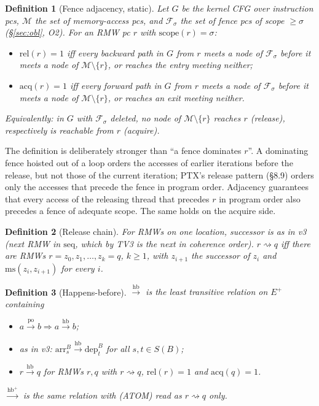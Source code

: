 \documentclass[11pt]{article}
\newtheorem{definition}{Definition}
\theoremstyle{remark}
\newcommand{\Eplus}{E^{+}}
\newcommand{\PO}{\xrightarrow{\mathrm{po}}}
\newcommand{\HB}{\xrightarrow{\mathrm{hb}}}
\newcommand{\HBu}{\xrightarrow{\mathrm{hb}^{+}}}
\newcommand{\scope}{\mathrm{scope}}
\newcommand{\rel}{\mathrm{rel}}
\newcommand{\acq}{\mathrm{acq}}
\newcommand{\ms}{\mathrm{ms}}
\newcommand{\seq}{\mathrm{seq}}
\newcommand{\chain}{\rightsquigarrow}
\newcommand{\Fences}{\mathcal{F}}
\newcommand{\Mem}{\mathcal{M}}
\begin{document}
\begin{definition}[Fence adjacency, static]\label{def:gate}
Let $G$ be the kernel CFG over instruction pcs, $\Mem$ the set of memory-access
pcs, and $\Fences_\sigma$ the set of fence pcs of scope $\ge\sigma$
(\S\ref{sec:obl}, O2). For an RMW pc $r$ with $\scope(r)=\sigma$:
\begin{itemize}[nosep]
\item $\rel(r)=1$ iff every backward path in $G$ from $r$ meets a node of
      $\Fences_\sigma$ before it meets a node of $\Mem\setminus\{r\}$, or
      reaches the entry meeting neither;
\item $\acq(r)=1$ iff every forward path in $G$ from $r$ meets a node of
      $\Fences_\sigma$ before it meets a node of $\Mem\setminus\{r\}$, or
      reaches an exit meeting neither.
\end{itemize}
Equivalently: in $G$ with $\Fences_\sigma$ deleted, no node of
$\Mem\setminus\{r\}$ reaches $r$ (release), respectively is reachable from $r$
(acquire).
\end{definition}

The definition is deliberately stronger than ``a fence dominates $r$''. A
dominating fence hoisted out of a loop orders the accesses of earlier
iterations before the release, but not those of the current iteration; PTX's
release pattern (\S8.9) orders only the accesses that precede the fence in
program order. Adjacency guarantees that every access of the releasing thread
that precedes $r$ in program order also precedes a fence of adequate scope.
The same holds on the acquire side.

\begin{definition}[Release chain]\label{def:chain}
For RMWs on one location, \emph{successor} is as in v3 (next RMW in $\seq$,
which by TV3 is the next in coherence order). $r\chain q$ iff there are RMWs
$r=z_0,z_1,\dots,z_k=q$, $k\ge1$, with $z_{i+1}$ the successor of $z_i$ and
$\ms(z_i,z_{i+1})$ for every $i$.
\end{definition}

\begin{definition}[Happens-before]\label{def:hb}
$\HB$ is the least transitive relation on $\Eplus$ containing
\begin{itemize}[nosep]
\item[(PO)] $a\PO b\Rightarrow a\HB b$;
\item[(SYNC)] as in v3: $\mathrm{arr}_s^B\HB\mathrm{dep}_t^B$ for all
      $s,t\in S(B)$;
\item[(ATOM)] $r\HB q$ for RMWs $r,q$ with $r\chain q$, $\rel(r)=1$ and
      $\acq(q)=1$.
\end{itemize}
$\HBu$ is the same relation with (ATOM) read as $r\chain q$ only.
\end{definition}
\end{document}
